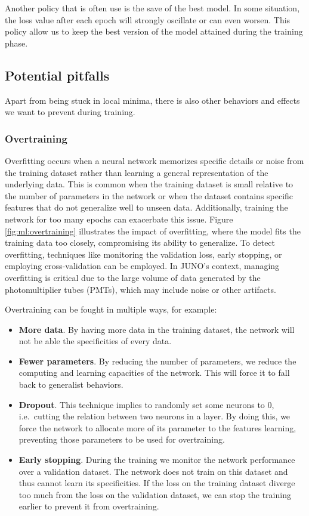 \documentclass[../main.tex]{subfiles}
\begin{document}
Another policy that is often use is the save of the best model. In some situation, the loss value after each epoch will strongly oscillate or can even worsen. This policy allow us to keep the best version of the model attained during the training phase.

\subsection{Potential pitfalls}
\label{sec:ml:pitfall}

Apart from being stuck in local minima, there is also other behaviors and effects we want to prevent during training.

\subsubsection{Overtraining}

Overfitting occurs when a neural network memorizes specific details or noise from the training dataset rather than learning a general representation of the underlying data. This is common when the training dataset is small relative to the number of parameters in the network or when the dataset contains specific features that do not generalize well to unseen data. Additionally, training the network for too many epochs can exacerbate this issue. Figure \ref{fig:ml:overtraining} illustrates the impact of overfitting, where the model fits the training data too closely, compromising its ability to generalize.
To detect overfitting, techniques like monitoring the validation loss, early stopping, or employing cross-validation can be employed. In JUNO's context, managing overfitting is critical due to the large volume of data generated by the photomultiplier tubes (PMTs), which may include noise or other artifacts.

Overtraining can be fought in multiple ways, for example:
\begin{itemize}
  \item \textbf{More data}. By having more data in the training dataset, the network will not be able the specificities of every data.
  \item \textbf{Fewer parameters}. By reducing the number of parameters, we reduce the computing and learning capacities of the network. This will force it to fall back to generalist behaviors.
  \item \textbf{Dropout}. This technique implies to randomly set some neurons to 0, i.e.\ cutting the relation between two neurons in a layer. By doing this, we force the network to allocate more of its parameter to the features learning, preventing those parameters to be used for overtraining.
  \item \textbf{Early stopping}. During the training we monitor the network performance over a validation dataset. The network does not train on this dataset and thus cannot learn its specificities. If the loss on the training dataset diverge too much from the loss on the validation dataset, we can stop the training earlier to prevent it from overtraining.
\end{itemize}
\end{document}
